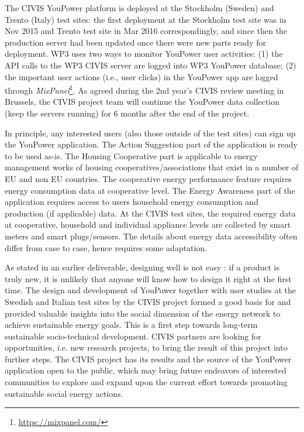 The CIVIS YouPower platform is deployed at the Stockholm (Sweden) and Trento (Italy) test sites:  the first deployment at the Stockholm test site was in Nov 2015 and Trento test site in Mar 2016 correspondingly, and since then the production server had been updated once there were new parts ready for deployment. WP3 uses two ways to monitor YouPower user activities: (1) the API calls to the WP3 CIVIS server are logged into WP3 YouPower database; (2) the important user actions (i.e., user clicks) in the YouPower app are logged  through \textit{MixPanel}\footnote{\url{https://mixpanel.com/}}.
As agreed during the 2nd year's CIVIS review meeting in Brussels, the CIVIS project team will continue the YouPower data collection (keep the servers running) for 6 months after the end of the project. 

In principle, any interested users (also those outside of the test sites) can sign up the YouPower application. The Action Suggestion part of the application is ready to be used as-is. The Housing Cooperative part is applicable to energy management works of housing cooperatives/associations that exist in a number of EU and non EU countries. The cooperative energy performance feature requires energy consumption data at cooperative level. The Energy Awareness part of the application requires access to users household energy consumption and production (if applicable) data. At the CIVIS test sites, the required energy data at cooperative, household and individual appliance levels are collected by smart meters and smart plugs/sensors. The details about energy data accessibility often differ from case to case, hence requires some adaptation. 

As stated in an earlier deliverable, designing well is not easy \citep{Norman2002}: if a product is truly new, it is unlikely that anyone will know how to design it right at the first time.  
The design and development of YouPower together with user studies at the Swedish and Italian test sites by the CIVIS project formed a good basis for and provided valuable insights into the social dimension of the energy network to achieve sustainable energy goals. This is a first step towards long-term sustainable socio-technical development.  
CIVIS partners are looking for opportunities, i.e. new research projects, to bring the result of this project into further steps. The CIVIS project has its results and the source of the YouPower application open to the public, which may bring future endeavors of interested communities to explore and expand upon the current effort towards promoting sustainable social energy actions. 



